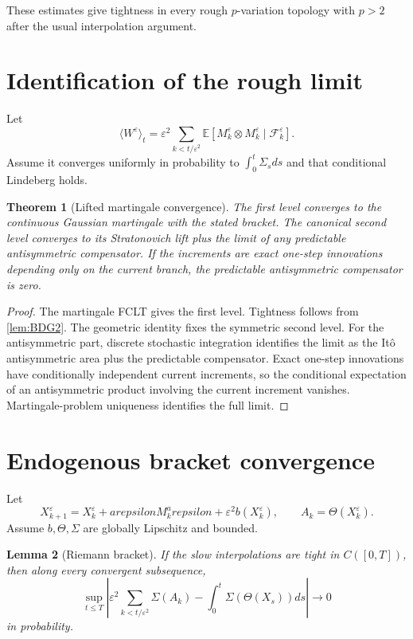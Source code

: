 \documentclass[11pt,reqno]{amsart}
\newtheorem{theorem}{Theorem}[section]
\newtheorem{lemma}[theorem]{Lemma}
\theoremstyle{definition}
\newcommand{\E}{\mathbb E}
\newcommand{\F}{\mathcal F}
\begin{document}
These estimates give tightness in every rough $p$-variation topology with
$p>2$ after the usual interpolation argument.

\section{Identification of the rough limit}

Let
\[
 \langle W^\varepsilon\rangle_t
 =\varepsilon^2\sum_{k<t/\varepsilon^2}
 \E[M_k^\varepsilon\otimes M_k^\varepsilon\mid\F_k^\varepsilon].
\]
Assume it converges uniformly in probability to
$\int_0^t\Sigma_sds$ and that conditional Lindeberg holds.

\begin{theorem}[Lifted martingale convergence]\label{thm:lifted-martingale}
The first level converges to the continuous Gaussian martingale with the stated
bracket.  The canonical second level converges to its Stratonovich lift plus
the limit of any predictable antisymmetric compensator.  If the increments
are exact one-step innovations depending only on the current branch, the
predictable antisymmetric compensator is zero.
\end{theorem}

\begin{proof}
The martingale FCLT gives the first level.  Tightness follows from
\cref{lem:BDG2}.  The geometric identity fixes the symmetric second level.
For the antisymmetric part, discrete stochastic integration identifies the
limit as the It\^o antisymmetric area plus the predictable compensator.  Exact
one-step innovations have conditionally independent current increments, so the
conditional expectation of an antisymmetric product involving the current
increment vanishes.  Martingale-problem uniqueness identifies the full limit.
\end{proof}

\section{Endogenous bracket convergence}

Let
\[
 X_{k+1}^\varepsilon=X_k^\varepsilon+arepsilon M_k^arepsilon
 +\varepsilon^2b(X_k^\varepsilon),
 \qquad A_k=\Theta(X_k^\varepsilon).
\]
Assume $b,\Theta,\Sigma$ are globally Lipschitz and bounded.

\begin{lemma}[Riemann bracket]\label{lem:Riemann-bracket}
If the slow interpolations are tight in $C([0,T])$, then along every convergent
subsequence,
\[
 \sup_{t\le T}\left\vert
 \varepsilon^2\sum_{k<t/\varepsilon^2}\Sigma(A_k)
 -\int_0^t\Sigma(\Theta(X_s))ds
 \right\vert\longrightarrow0
\]
in probability.
\end{lemma}
\end{document}

